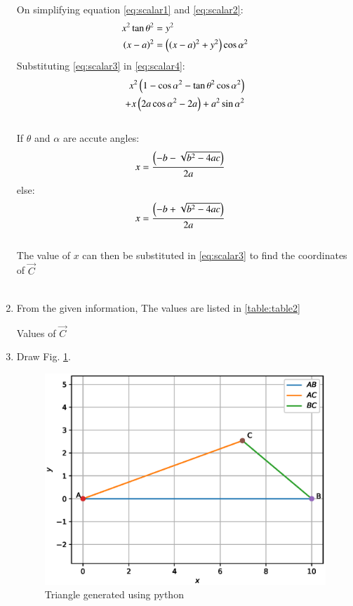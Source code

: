\begin{enumerate}[label=\thesection.\arabic*.,ref=\thesection.\theenumi]
On simplifying equation \ref{eq:scalar1} and \ref{eq:scalar2}:
\begin{align}
x^2 \tan{\theta}^2 &= y^2 \label{eq:scalar3}\\
\left(x - a\right)^2 &= \left(\left(x-a\right)^2 + y^2\right)\cos{\alpha}^2\label{eq:scalar4}
\end{align}
Substituting \ref{eq:scalar3} in \ref{eq:scalar4}:
\begin{align}
\begin{split}\label{eq:scalar5}
x^2\left(1-\cos{\alpha}^2-\tan{\theta}^2\cos{\alpha}^2\right)\\
+ x\left(2a\cos{\alpha}^2-2a\right) + a^2\sin{\alpha}^2
\end{split}
\end{align}\\

If $\theta$ and $\alpha$ are accute angles:
\begin{align}
x &= \frac{\left(-b-\sqrt{b^2-4ac}\right)}{2a}
\end{align}
else:
\begin{align}
x &= \frac{\left(-b+\sqrt{b^2-4ac}\right)}{2a}
\end{align}\\

The value of $x$ can then be substituted in \ref{eq:scalar3} to find the coordinates of $\vec{C}$\\ \\

\item
From the given information, 
The values are listed in \ref{table:table2}\\
\begin{table}[ht!]
\centering

\caption{Values of $\vec{C}$}
\label{table:table2}	
\end{table} 

\item Draw Fig. \ref{fig:triangle2}.

\begin{figure}[!ht]
\centering
\includegraphics[width=\columnwidth]{./figs/triangle_linearalg.eps}
\caption{Triangle generated using python}
\label{fig:triangle2}
\end{figure} 


\end{enumerate}
